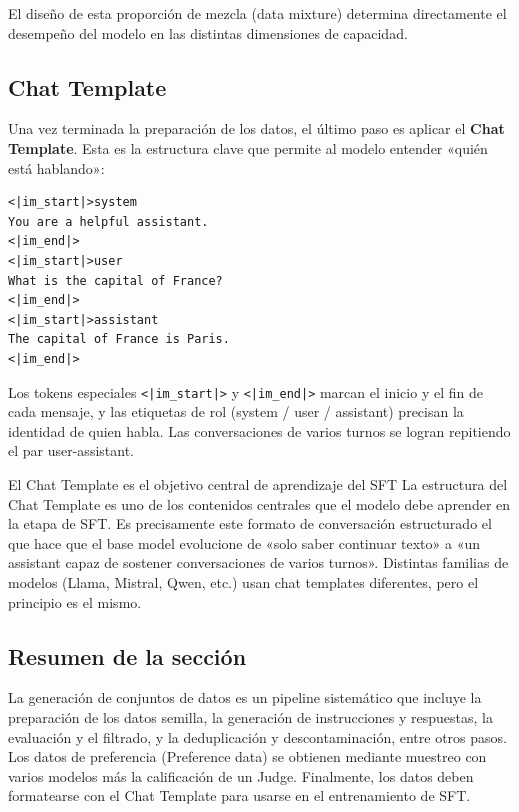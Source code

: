 El diseño de esta proporción de mezcla (data mixture) determina directamente el desempeño del modelo en las distintas dimensiones de capacidad.

\subsection{Chat Template}

Una vez terminada la preparación de los datos, el último paso es aplicar el \textbf{Chat Template}. Esta es la estructura clave que permite al modelo entender «quién está hablando»:

\begin{lstlisting}[caption={Ejemplo de Chat Template (formato ChatML)}]
<|im_start|>system
You are a helpful assistant.
<|im_end|>
<|im_start|>user
What is the capital of France?
<|im_end|>
<|im_start|>assistant
The capital of France is Paris.
<|im_end|>
\end{lstlisting}

Los tokens especiales \texttt{<|im\_start|>} y \texttt{<|im\_end|>} marcan el inicio y el fin de cada mensaje, y las etiquetas de rol (system / user / assistant) precisan la identidad de quien habla. Las conversaciones de varios turnos se logran repitiendo el par user-assistant.

\begin{importantbox}{El Chat Template es el objetivo central de aprendizaje del SFT}
La estructura del Chat Template es uno de los contenidos centrales que el modelo debe aprender en la etapa de SFT. Es precisamente este formato de conversación estructurado el que hace que el base model evolucione de «solo saber continuar texto» a «un assistant capaz de sostener conversaciones de varios turnos». Distintas familias de modelos (Llama, Mistral, Qwen, etc.) usan chat templates diferentes, pero el principio es el mismo.
\end{importantbox}

\subsection{Resumen de la sección}

La generación de conjuntos de datos es un pipeline sistemático que incluye la preparación de los datos semilla, la generación de instrucciones y respuestas, la evaluación y el filtrado, y la deduplicación y descontaminación, entre otros pasos. Los datos de preferencia (Preference data) se obtienen mediante muestreo con varios modelos más la calificación de un Judge. Finalmente, los datos deben formatearse con el Chat Template para usarse en el entrenamiento de SFT.

\newpage

